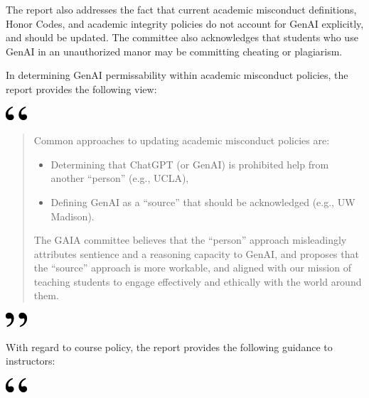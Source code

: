 \documentclass[
]{book}
\begin{document}
The report also addresses the fact that current academic misconduct definitions, Honor Codes, and academic integrity policies do not account for GenAI explicitly, and should be updated. The committee also acknowledges that students who use GenAI in an unauthorized manor may be committing cheating or plagiarism.

In determining GenAI permissability within academic misconduct policies, the report provides the following view:

\includegraphics[width=0.3125in,height=0.20833in]{open.png}

\begin{quote}
Common approaches to updating academic misconduct policies are:

\begin{itemize}
\item
  Determining that ChatGPT (or GenAI) is prohibited help from another ``person'' (e.g., UCLA),
\item
  Defining GenAI as a ``source'' that should be acknowledged (e.g., UW Madison).
\end{itemize}

The GAIA committee believes that the ``person'' approach misleadingly attributes sentience and a reasoning capacity to GenAI, and proposes that the ``source'' approach is more workable, and aligned with our mission of teaching students to engage effectively and ethically with the world around them.
\end{quote}

\includegraphics[width=0.3125in,height=0.20833in]{close.png}

With regard to course policy, the report provides the following guidance to instructors:

\includegraphics[width=0.3125in,height=0.20833in]{open.png}
\end{document}
